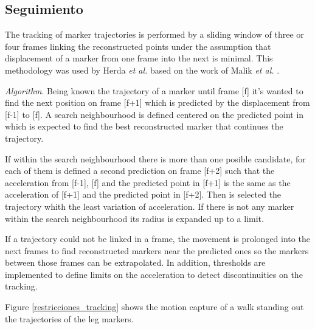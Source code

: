 \subsection{Seguimiento}

The tracking of marker trajectories is performed by a sliding window of three or four frames linking the reconstructed points under the assumption that displacement of a marker from one frame into the next is minimal. This methodology was used by Herda \textit{et al.} \cite{herda} based on the work of Malik \textit{et al.} \cite{griegos}.

\hspace*{0.5cm} \textit{Algorithm}. Being known the trajectory of a marker until frame [f]  it's wanted to find the next position on frame [f+1] which is predicted by the displacement from [f-1] to [f]. A search neighbourhood is defined centered on the predicted point in which is expected to find the best reconstructed marker that continues the trajectory.

If within the search neighbourhood there is more than one posible candidate, for each of them is defined a second prediction on frame [f+2] such that the acceleration from [f-1], [f] and the predicted point in [f+1] is the same as the acceleration of [f+1] and the predicted point in [f+2]. Then is selected the trajectory whith the least variation of acceleration. If there is not any marker within the search neighbourhood  its radius is expanded up to a limit.


If a trajectory could not be linked in a frame, the movement is prolonged into the next frames to find reconstructed markers near the predicted ones so the markers between those frames can be extrapolated. In addition, thresholds are implemented to define limits on the acceleration to detect discontinuities on the tracking.


Figure \ref{restricciones_tracking} shows the motion capture of a walk standing out the trajectories of the leg markers.

